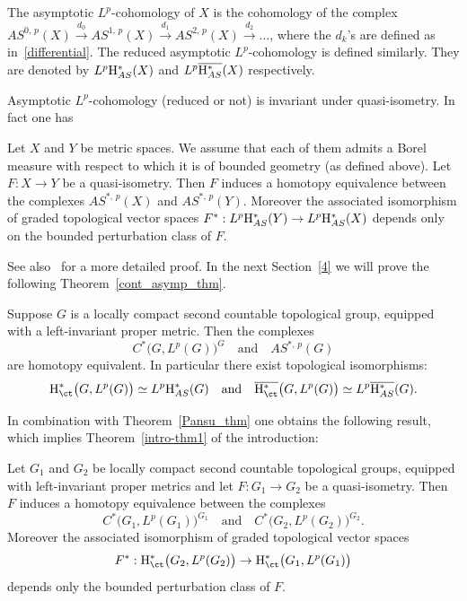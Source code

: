 \begin{defi}\label{cont_asymp-def}
The asymptotic $L^p$-cohomology of $X$ is the cohomology of the complex $AS^{0,\,p}(X) \stackrel{d_0}{\to} AS^{1,\,p}(X) \stackrel{d_1}{\to} AS^{2,\,p}(X) \stackrel{d_2}{\to}\dots$, where the $d_k$'s are defined as in~\eqref{differential}. The reduced asymptotic $L^p$-cohomology is defined similarly. They are denoted by $L^p {\rm H}_{AS}^* (X)$ and $L^p \overline{{\rm H}_{AS}^*} (X)$ respectively.
\end{defi}

Asymptotic $L^p$-cohomology (reduced or not) is invariant under quasi-isometry. In fact one has

\begin{theo}[\cite{Pa95}] \label{Pansu_thm}
Let $X$ and $Y$ be metric spaces. We assume that each of them admits a Borel measure with respect to which it is of bounded geometry (as defined above). Let $F : X \to Y$ be a quasi-isometry. Then $F$ induces a homotopy equivalence between the complexes $AS^{*,\,p}(X)$ and $AS^{*,\,p}(Y)$. Moreover the associated isomorphism of graded topological vector spaces $F^* : L^p {\rm H}_{AS}^* (Y) \to L^p {\rm H}_{AS}^* (X)$ depends only on the bounded perturbation class of $F$.
\end{theo}


See also~\cite{Genton} for a more detailed proof. In the next Section~\ref{4} we will prove the following Theorem~\ref{cont_asymp_thm}.

\begin{theo}\label{cont_asymp_thm}
Suppose $G$ is a locally compact second countable topological group, equipped with a left-invariant proper metric. Then the complexes
\[
C^*\bigl(G, L^p(G)\bigr)^G\quad\text{and}\quad AS^{*,\,p}(G)
\]
are homotopy equivalent. In particular there exist topological isomorphisms:
\[
{\rm H}_{\ct}^* \bigl(G, L^p (G)\bigr) \simeq L^p {\rm H}_{AS}^* (G)\quad\text{and}\quad
\overline{{\rm H}_{\ct} ^*} \bigl(G, L^p (G)\bigr) \simeq L^p \overline{{\rm H}_{AS}^*} (G).
\]
\end{theo}

In combination with Theorem~\ref{Pansu_thm} one obtains the following result, which implies Theorem~\ref{intro-thm1} of the introduction:

\begin{coro}\label{cont_asymp_cor}
Let $G_1$ and $G_2$ be locally compact second countable topological groups, equipped with left-invariant proper metrics and let $F : G_1 \to G_2$ be a quasi-isometry. Then $F$ induces a homotopy equivalence between the complexes
\[
C^*\bigl(G_1, L^p(G_1)\bigr)^{G_1}\quad\text{and}\quad C^*\bigl(G_2, L^p(G_2)\bigr)^{G_2}. 
\]
Moreover the associated isomorphism of graded topological vector spaces
\[
F ^* :{\rm H}^*_{\ct} \bigl(G_2, L^p(G_2) \bigr) \to {\rm H}^*_{\ct} \bigl(G_1, L^p(G_1) \bigr)
\] 
depends only the bounded perturbation class of $F$.
\end{coro}



